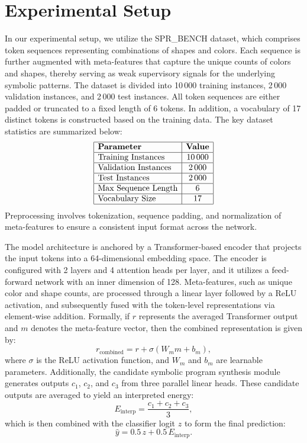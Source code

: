 \documentclass[11pt]{article}
\begin{document}
\section{Experimental Setup}
\noindent In our experimental setup, we utilize the SPR\_BENCH dataset, which comprises token sequences representing combinations of shapes and colors. Each sequence is further augmented with meta-features that capture the unique counts of colors and shapes, thereby serving as weak supervisory signals for the underlying symbolic patterns. The dataset is divided into 10\,000 training instances, 2\,000 validation instances, and 2\,000 test instances. All token sequences are either padded or truncated to a fixed length of 6 tokens. In addition, a vocabulary of 17 distinct tokens is constructed based on the training data. The key dataset statistics are summarized below:
\[
\begin{array}{|l|c|}
\hline
\textbf{Parameter} & \textbf{Value} \\
\hline
\text{Training Instances} & 10\,000 \\
\hline
\text{Validation Instances} & 2\,000 \\
\hline
\text{Test Instances} & 2\,000 \\
\hline
\text{Max Sequence Length} & 6 \\
\hline
\text{Vocabulary Size} & 17 \\
\hline
\end{array}
\]
Preprocessing involves tokenization, sequence padding, and normalization of meta-features to ensure a consistent input format across the network.

\noindent The model architecture is anchored by a Transformer-based encoder that projects the input tokens into a 64-dimensional embedding space. The encoder is configured with 2 layers and 4 attention heads per layer, and it utilizes a feed-forward network with an inner dimension of 128. Meta-features, such as unique color and shape counts, are processed through a linear layer followed by a ReLU activation, and subsequently fused with the token-level representations via element-wise addition. Formally, if \(r\) represents the averaged Transformer output and \(m\) denotes the meta-feature vector, then the combined representation is given by:
\[
r_{\text{combined}} = r + \sigma(W_m m + b_m),
\]
where \(\sigma\) is the ReLU activation function, and \(W_m\) and \(b_m\) are learnable parameters. Additionally, the candidate symbolic program synthesis module generates outputs \(c_1\), \(c_2\), and \(c_3\) from three parallel linear heads. These candidate outputs are averaged to yield an interpreted energy:
\[
E_{\text{interp}} = \frac{c_1 + c_2 + c_3}{3},
\]
which is then combined with the classifier logit \(z\) to form the final prediction:
\[
\hat{y} = 0.5\, z + 0.5\, E_{\text{interp}}.
\]
\end{document}
